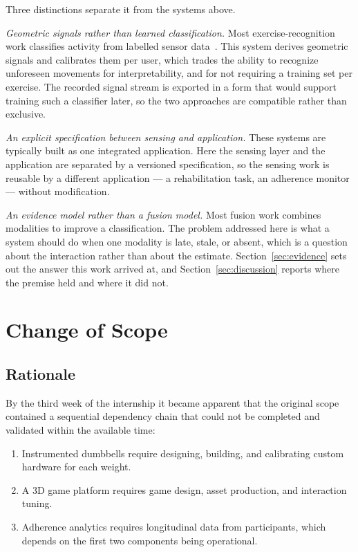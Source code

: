 \documentclass[11pt,a4paper]{article}
\begin{document}
Three distinctions separate it from the systems above.

\emph{Geometric signals rather than learned classification.} Most
exercise-recognition work classifies activity from labelled sensor
data~\cite{gymimu,exersense,multimodalrep}. This system derives geometric
signals and calibrates them per user, which trades the ability to recognize
unforeseen movements for interpretability, and for not requiring a training set
per exercise. The recorded signal stream is exported in a form that would
support training such a classifier later, so the two approaches are compatible
rather than exclusive.

\emph{An explicit specification between sensing and application.} These systems
are typically built as one integrated application. Here the sensing layer and
the application are separated by a versioned specification, so the sensing work
is reusable by a different application --- a rehabilitation task, an adherence
monitor --- without modification.

\emph{An evidence model rather than a fusion model.} Most fusion work combines
modalities to improve a classification. The problem addressed here is what a
system should do when one modality is late, stale, or absent, which is a
question about the interaction rather than about the estimate.
Section~\ref{sec:evidence} sets out the answer this work arrived at, and
Section~\ref{sec:discussion} reports where the premise held and where it did
not.

\section{Change of Scope}
\label{sec:scope}

\subsection{Rationale}

By the third week of the internship it became apparent that the original scope
contained a sequential dependency chain that could not be completed and validated
within the available time:

\begin{enumerate}
\item Instrumented dumbbells require designing, building, and calibrating custom
      hardware for each weight.
\item A 3D game platform requires game design, asset production, and interaction
      tuning.
\item Adherence analytics requires longitudinal data from participants, which
      depends on the first two components being operational.
\end{enumerate}
\end{document}
